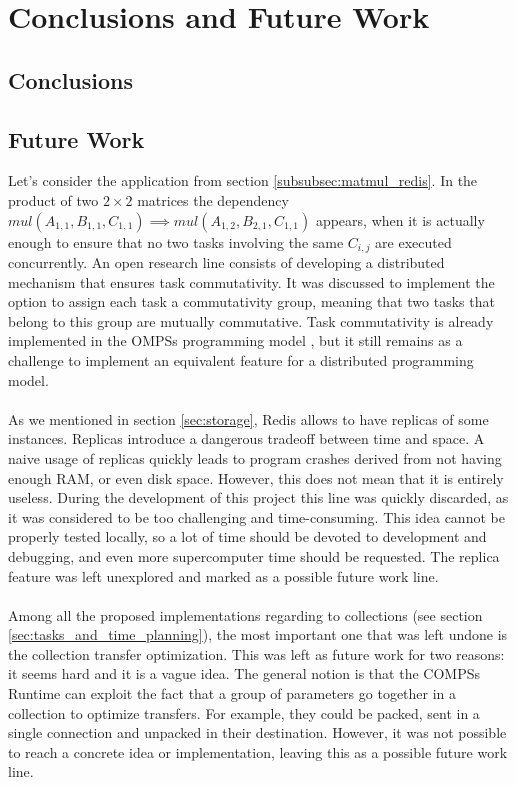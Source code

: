 \section{Conclusions and Future Work}
\subsection{Conclusions}
\label{subsec:conclusions}


\subsection{Future Work}
\label{subsec:future_work}

Let's consider the application from section \ref{subsubsec:matmul_redis}. In the product of two $2 \times 2$ matrices the dependency $mul(A_{1, 1}, B_{1, 1}, C_{1, 1}) \implies mul(A_{1,2}, B_{2, 1}, C_{1, 1})$ appears, when it is actually enough to ensure that no two tasks involving the same $C_{i, j}$ are executed concurrently. An open research line consists of developing a distributed mechanism that ensures task commutativity. It was discussed to implement the option to assign each task a commutativity group, meaning that two tasks that belong to this group are mutually commutative. Task commutativity is already implemented in the OMPSs programming model \cite{duran2011ompss}, but it still remains as a challenge to implement an equivalent feature for a distributed programming model.\\
\\
As we mentioned in section \ref{sec:storage}, Redis allows to have replicas of some instances. Replicas introduce a dangerous tradeoff between time and space. A naive usage of replicas quickly leads to program crashes derived from not having enough RAM, or even disk space. However, this does not mean that it is entirely useless. During the development of this project this line was quickly discarded, as it was considered to be too challenging and time-consuming. This idea cannot be properly tested locally, so a lot of time should be devoted to development and debugging, and even more supercomputer time should be requested. The replica feature was left unexplored and marked as a possible future work line.\\
\\
Among all the proposed implementations regarding to collections (see section \ref{sec:tasks_and_time_planning}), the most important one that was left undone is the collection transfer optimization. This was left as future work for two reasons: it seems hard and it is a vague idea. The general notion is that the COMPSs Runtime can exploit the fact that a group of parameters go together in a collection to optimize transfers. For example, they could be packed, sent in a single connection and unpacked in their destination. However, it was not possible to reach a concrete idea or implementation, leaving this as a possible future work line.